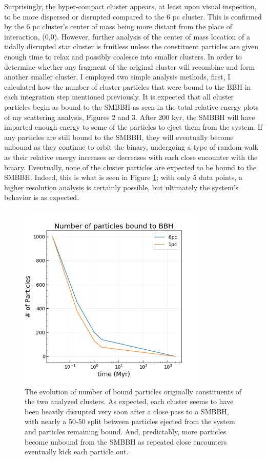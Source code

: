 \documentclass{aastex62}
\begin{document}
Surprisingly, the hyper-compact cluster appears, at least upon visual inspection, to be more dispersed or disrupted compared to the 6 pc cluster. This is confirmed by the 6 pc cluster's center of mass being more distant from the place of interaction, (0,0). However, further analysis of the center of mass location of a tidally disrupted star cluster is fruitless unless the constituent particles are given enough time to relax and possibly coalesce into smaller clusters. In order to determine whether any fragment of the original cluster will recombine and form another smaller cluster, I employed two simple analysis methods, first, I calculated how the number of cluster particles that were bound to the BBH in each integration step mentioned previously. It is expected that all cluster particles begin as bound to the SMBBH as seen in the total relative energy plots of my scattering analysis, Figures 2 and 3. After 200 kyr, the SMBBH will have imparted enough energy to some of the particles to eject them from the system. If any particles are still bound to the SMBBH, they will eventually become unbound as they continue to orbit the binary, undergoing a type of random-walk as their relative energy increases or decreases with each close encounter with the binary. Eventually, none of the cluster particles are expected to be bound to the SMBBH. Indeed, this is what is seen in Figure \ref{fig6}; with only 5 data points, a higher resolution analysis is certainly possible, but ultimately the system's behavior is as expected.
\begin{figure}
\includegraphics[width=9cm,height=9cm]{./Images/bound_particle_number.png}
\centering
\caption{The evolution of number of bound particles originally constituents of the two analyzed clusters. As expected, each cluster seems to have been heavily disrupted very soon after a close pass to a SMBBH, with nearly a 50-50 split between particles ejected from the system and particles remaining bound. And, predictably, more particles become unbound from the SMBBH as repeated close encounters eventually kick each particle out.\label{fig6}}
\end{figure}
\end{document}

